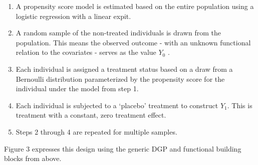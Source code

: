 \documentclass[../main.tex]{subfiles}
\begin{document}
\vspace{\baselineskip}
\begin{enumerate}
	\item A propensity score model is estimated based on the entire population using a logistic regression with a linear expit.\par

	\item A random sample of the non-treated individuals is drawn from the population. This means the observed outcome - with an unknown functional relation to the covariates - serves as the value  \( Y_{0} \) .\par

	\item Each individual is assigned a treatment status based on a draw from a Bernoulli distribution parameterized by the propensity score for the individual under the model from step 1.\par

	\item Each individual is subjected to a ‘placebo’ treatment to construct  \( Y_{1}. \) This is treatment with a constant, zero treatment effect.\par

	\item Steps 2 through 4 are repeated for multiple samples.
\end{enumerate}\par


\vspace{\baselineskip}
Figure 3 expresses this design using the generic DGP and functional building blocks from above.\par


\vspace{\baselineskip}


\end{document}
